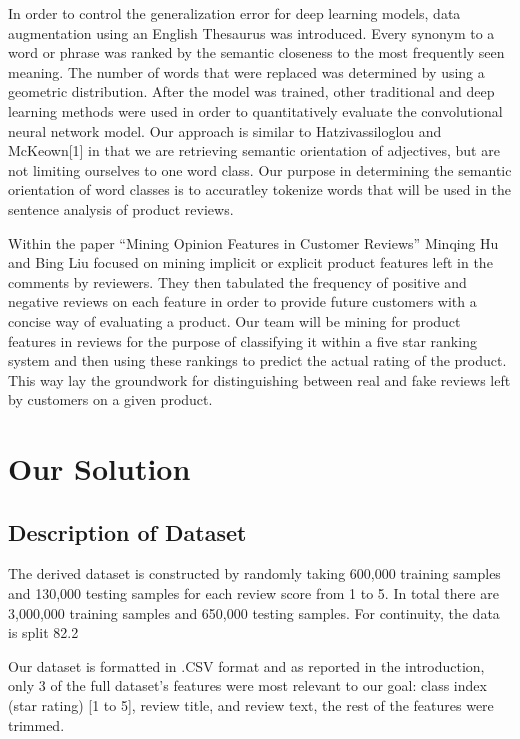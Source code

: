 \documentclass[conference]{IEEEtran}
\begin{document}
In order to control the generalization error for deep learning models, data augmentation using an English Thesaurus was introduced. Every synonym to a word or phrase was ranked by the semantic closeness to the most frequently seen meaning. The number of words that were replaced was determined by using a geometric distribution. After the model was trained, other traditional and deep learning methods were used in order to quantitatively evaluate the convolutional neural network model. 
Our approach is similar to Hatzivassiloglou and McKeown[1] in that we are retrieving semantic orientation of adjectives, but are not limiting ourselves to one word class. Our purpose in determining the semantic orientation of word classes is to accuratley tokenize words that will be used in the sentence analysis of product reviews.  

Within the paper “Mining Opinion Features in Customer Reviews” Minqing Hu and Bing Liu focused on mining implicit or explicit product features left in the comments by reviewers. They then tabulated the frequency of positive and negative reviews on each feature in order to provide future customers with a concise way of evaluating a product. Our team will be mining for product features in reviews for the purpose of classifying it within a five star ranking system and then using these rankings to predict the actual rating of the product. This way lay the groundwork for distinguishing between real and fake reviews left by customers on a given product.    

\section{Our Solution}

\subsection{Description of Dataset}
The derived dataset is constructed by randomly taking 600,000 training samples and 130,000 testing samples for each review score from 1 to 5. In total there are 3,000,000 training samples and 650,000 testing samples. For continuity, the data is split 82.2%


Our dataset is formatted in .CSV format and as reported in the introduction, only 3 of the full dataset’s features were most relevant to our goal: class index (star rating) [1 to 5], review title, and review text, the rest of the features were trimmed.
\end{document}
